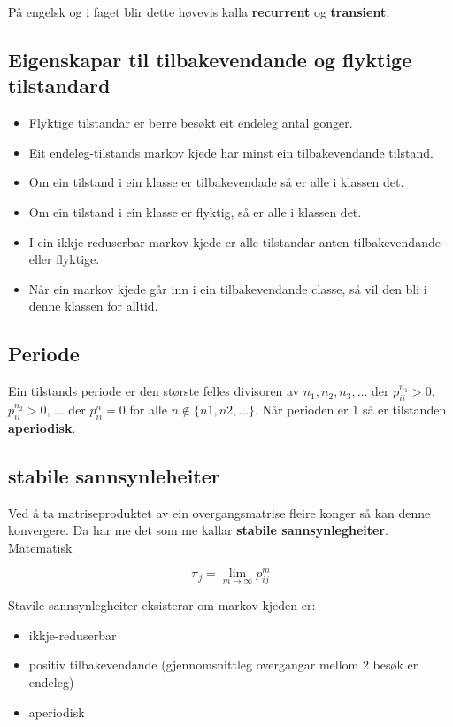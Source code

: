 På engelsk og i faget blir dette høvevis kalla \textbf{recurrent} og \textbf{transient}.

\subsection{Eigenskapar til tilbakevendande og flyktige tilstandard}
\begin{itemize}
    \item Flyktige tilstandar er berre besøkt eit endeleg antal gonger.
    \item Eit endeleg-tilstands markov kjede har minst ein tilbakevendande tilstand.
    \item Om ein tilstand i ein klasse er tilbakevendade så er alle i klassen det.
    \item Om ein tilstand i ein klasse er flyktig, så er alle i klassen det.
    \item I ein ikkje-reduserbar markov kjede er alle tilstandar anten tilbakevendande eller flyktige.
    \item Når ein markov kjede går inn i ein tilbakevendande classe, så vil den bli i denne klassen for alltid.
\end{itemize}

\subsection{Periode}
Ein tilstands periode er den største felles divisoren av $n_1, n_2, n_3, \dots$ der $p_{ii}^{n_1} > 0$, $p_{ii}^{n_2} > 0$, $\dots$ der $p_{ii}^{n} = 0$ for alle $n \notin \{n1, n2, \dots\}$. Når perioden er 1 så er tilstanden \textbf{aperiodisk}. 

\subsection{stabile sannsynleheiter}

Ved å ta matriseproduktet av ein overgangsmatrise fleire konger så kan denne konvergere. Da har me det som me kallar \textbf{stabile sannsynlegheiter}.
Matematisk

\begin{equation}
    \pi_j = \lim_{m \rightarrow \infty} p^{m}_{ij}
\end{equation}

Stavile sannsynlegheiter eksisterar om markov kjeden er:

\begin{itemize}
    \item ikkje-reduserbar
    \item positiv tilbakevendande (gjennomsnittleg overgangar mellom 2 besøk er endeleg)
    \item aperiodisk
\end{itemize}




